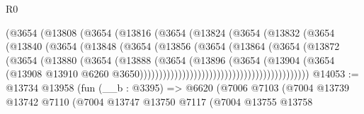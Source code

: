 \begin{lexlean}{R0}
\begin{coremodule}
                                    (@3654
                                      (@13808
                                        (@3654
                                          (@13816
                                            (@3654
                                              (@13824
                                                (@3654
                                                  (@13832
                                                    (@3654
                                                      (@13840
                                                        (@3654
                                                          (@13848
                                                            (@3654
                                                              (@13856
                                                                (@3654
                                                                  (@13864
                                                                    (@3654
                                                                      (@13872
                                                                        (@3654
                                                                          (@13880
                                                                            (@3654
                                                                              (@13888
                                                                                (@3654
                                                                                  (@13896
                                                                                    (@3654
                                                                                      (@13904
                                                                                        (@3654
                                                                                          (@13908
                                                                                            @13910
                                                                                            @6260
                                                                                            @3650))))))))))))))))))))))))))))))))))))))))))))
@14053 := @13734
    @13958
    (fun (__b : @3395) =>
    @6620
      (@7006
        @7103
        (@7004
          @13739
          @13742
          @7110
          (@7004
            @13747
            @13750
            @7117
            (@7004
              @13755
              @13758

\end{coremodule}
\end{lexlean}
